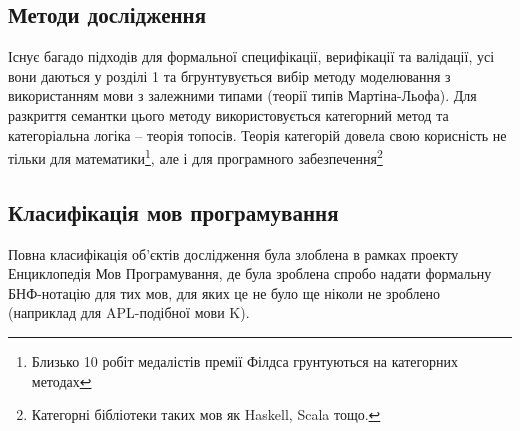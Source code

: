 \subsection{Методи дослідження}
Існує багадо підходів для формальної специфікації,
верифікації та валідації, усі вони даються у розділі 1 та
бгрунтувується вибір методу моделювання з використанням
мови з залежними типами (теорії типів Мартіна-Льофа).
Для разкриття семантки цього методу використовується
категорний метод та категоріальна логіка -- теорія топосів.
Теорія категорій довела свою корисність не тільки для
математики\footnote{Близько 10 робіт медалістів премії
Філдса грунтуються на категорних методах},
але і для програмного
забезпечення\footnote{Категорні бібліотеки таких мов як Haskell, Scala тощо.}

\subsection{Класифікація мов програмування}
Повна класифікація об'єктів дослідження була злоблена в рамках проекту
Енциклопедія Мов Програмування, де була зроблена спробо надати
формальну БНФ-нотацію для тих мов, для яких це не було ще ніколи
не зроблено (наприклад для APL-подібної мови K).

